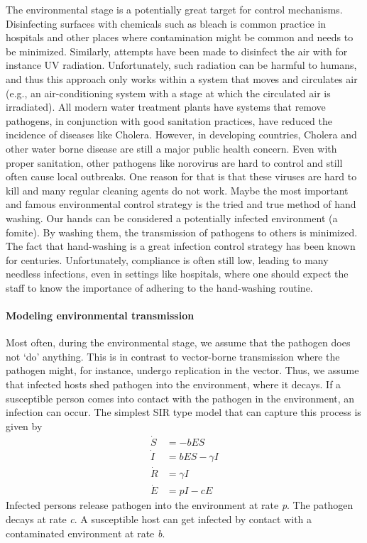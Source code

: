 \documentclass[]{article}
\let\oldparagraph\paragraph
\renewcommand{\paragraph}[1]{\oldparagraph{#1}\mbox{}}
\theoremstyle{definition}
\theoremstyle{definition}
\theoremstyle{definition}
\theoremstyle{remark}
\begin{document}
The environmental stage is a potentially great target for control
mechanisms. Disinfecting surfaces with chemicals such as bleach is
common practice in hospitals and other places where contamination might
be common and needs to be minimized. Similarly, attempts have been made
to disinfect the air with for instance UV radiation. Unfortunately, such
radiation can be harmful to humans, and thus this approach only works
within a system that moves and circulates air (e.g., an air-conditioning
system with a stage at which the circulated air is irradiated). All
modern water treatment plants have systems that remove pathogens, in
conjunction with good sanitation practices, have reduced the incidence
of diseases like Cholera. However, in developing countries, Cholera and
other water borne disease are still a major public health concern. Even
with proper sanitation, other pathogens like norovirus are hard to
control and still often cause local outbreaks. One reason for that is
that these viruses are hard to kill and many regular cleaning agents do
not work. Maybe the most important and famous environmental control
strategy is the tried and true method of hand washing. Our hands can be
considered a potentially infected environment (a fomite). By washing
them, the transmission of pathogens to others is minimized. The fact
that hand-washing is a great infection control strategy has been known
for centuries. Unfortunately, compliance is often still low, leading to
many needless infections, even in settings like hospitals, where one
should expect the staff to know the importance of adhering to the
hand-washing routine.

\paragraph{Modeling environmental transmission}\label{myadvancedbox}

Most often, during the environmental stage, we assume that the pathogen
does not `do' anything. This is in contrast to vector-borne transmission
where the pathogen might, for instance, undergo replication in the
vector. Thus, we assume that infected hosts shed pathogen into the
environment, where it decays. If a susceptible person comes into contact
with the pathogen in the environment, an infection can occur. The
simplest SIR type model that can capture this process is given by \[ 
\begin{aligned}
\dot S &= - b E S \\
\dot I &= b E S  - \gamma I \\
\dot R &= \gamma I \\
\dot E &= p I - cE
\end{aligned}
\] Infected persons release pathogen into the environment at rate
\emph{p}. The pathogen decays at rate \emph{c}. A susceptible host can
get infected by contact with a contaminated environment at rate
\emph{b}.
\end{document}
